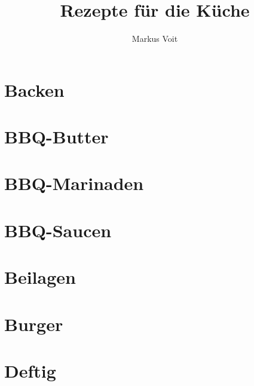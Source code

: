 \documentclass[
  DIV=11,%
  pagesize,%
  fontsize=11pt,%
  paper=a4,%
  numbers=noenddot,
]{scrartcl}
\title{Rezepte für die Küche}
\author{Markus Voit}
\begin{document}
\maketitle
\clearpage

\tableofcontents
\clearpage

\section{Backen}
\newpage
\newpage

\section{BBQ-Butter}
\newpage
\newpage
\newpage
\newpage
\newpage

\section{BBQ-Marinaden}
\newpage
\newpage
\newpage

\section{BBQ-Saucen}
\newpage
\newpage
\newpage
\newpage
\newpage
\newpage
\newpage

\section{Beilagen}
\newpage

\section{Burger}
\newpage
\newpage

\section{Deftig}
\newpage
\newpage
\newpage
\newpage
\end{document}
